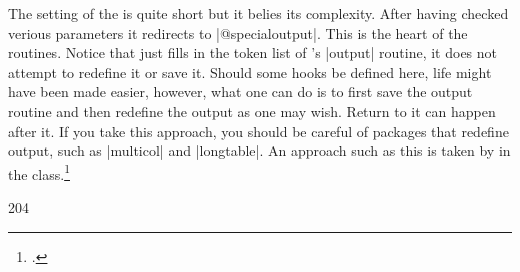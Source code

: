 The setting of the  is quite short but it belies its complexity.
After having checked verious parameters it redirects to |@specialoutput|. This is the heart of the routines. Notice that \latex just fills in the token list of \tex's |output| routine, it does not attempt to redefine it or save it. 
Should some hooks be defined here, life might have been made easier, however, what one can do is to first save the \latex output routine and then redefine the output as one may wish. Return to it can happen after it. If you take this approach, you should be careful of packages that redefine output, such as |multicol| and |longtable|. An approach such as this is taken by \citeauthor{revtex} in the  class.\footcite[][This is a document class of the American Physical Society. It enables submission to any of the APS journals. Its distribution point is \protect\url{http://publish.aps.org/revtex4/}]{revtex}

\begin{teX}
204 
\end{teX}




